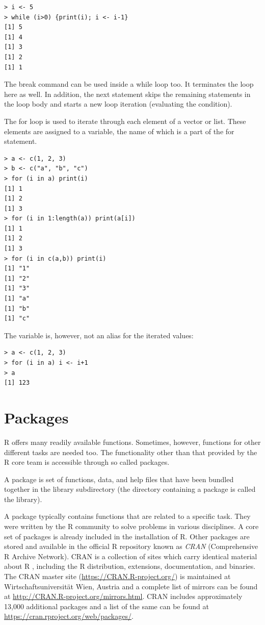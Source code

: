 \documentclass[11pt,openany,executivepaper]{book}
\begin{document}
\begin{verbatim}
> i <- 5
> while (i>0) {print(i); i <- i-1}
[1] 5
[1] 4
[1] 3
[1] 2
[1] 1
\end{verbatim}

The break command can be used inside a while loop too. It terminates the loop here as well. In addition, the next statement skips the remaining statements in the loop body and starts a new loop iteration (evaluating the condition).

The for loop is used to iterate through each element of a vector or list. These elements are assigned to a variable, the name of which is a part of the for statement.

\begin{verbatim}
> a <- c(1, 2, 3)
> b <- c("a", "b", "c")
> for (i in a) print(i)
[1] 1
[1] 2
[1] 3
> for (i in 1:length(a)) print(a[i])
[1] 1
[1] 2
[1] 3
> for (i in c(a,b)) print(i)
[1] "1"
[1] "2"
[1] "3"
[1] "a"
[1] "b"
[1] "c"
\end{verbatim}

The variable is, however, not an alias for the iterated values:

\begin{verbatim}
> a <- c(1, 2, 3)
> for (i in a) i <- i+1
> a
[1] 123
\end{verbatim}

\section{Packages}
R offers many readily available functions. Sometimes, however, functions for other different tasks are needed too. The functionality other than that provided by the R core team is accessible through so called packages.

A package is set of functions, data, and help files that have been bundled together in the library subdirectory (the directory containing a package is called the library).

A package typically contains functions that are related to a specific task. They were written by the R community to solve problems in various disciplines. A core set of packages is already included in the installation of R. Other packages are stored and available in the official R repository known as \textit{CRAN} (Comprehensive R Archive Network). CRAN is a collection of sites which carry identical material about R , including the R distribution, extensions, documentation, and binaries. The CRAN master site (\href{https://CRAN.R-project.org/}{https://CRAN.R-project.org/}) is maintained at Wirtschaftsuniversität Wien, Austria and a complete list of mirrors can be found at \url{http://CRAN.R-project.org/mirrors.html}. CRAN includes approximately 13,000 additional packages and a list of the same can be found at \href{https://cran.rproject.org/web/packages/}{https://cran.rproject.org/web/packages/}.
\end{document}
